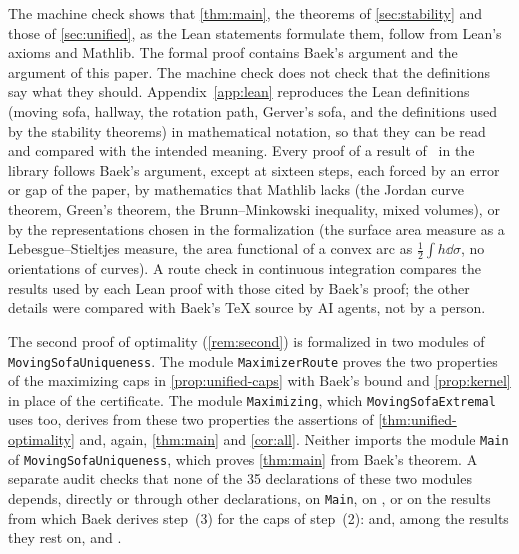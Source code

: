 The machine check shows that \cref{thm:main}, the theorems of
\cref{sec:stability} and those of \cref{sec:unified}, as the Lean statements
formulate them, follow from Lean's axioms and Mathlib. The formal proof
contains Baek's argument and the argument of this paper. The machine check does
not check that the definitions say what
they should. Appendix~\ref{app:lean} reproduces the Lean definitions (moving
sofa, hallway, the rotation path, Gerver's sofa, and the definitions used by the
stability theorems) in mathematical notation, so that they can be read and
compared with the intended meaning. Every proof of a result of~\cite{Baek} in
the library follows Baek's argument, except at sixteen steps, each forced by an
error or gap of the paper, by mathematics that Mathlib lacks (the Jordan curve
theorem, Green's theorem, the Brunn--Minkowski inequality, mixed volumes), or by
the representations chosen in the formalization (the surface area measure as a
Lebesgue--Stieltjes measure, the area functional of a convex arc as $\frac12\int
h\dd\sigma$, no orientations of curves). A route check in continuous integration
compares the results used by each Lean proof with those cited by Baek's proof;
the other details were compared with Baek's TeX source by AI agents, not by a
person.

The second proof of optimality (\cref{rem:second}) is formalized in two modules
of \texttt{MovingSofaUniqueness}. The module \texttt{MaximizerRoute} proves the
two properties of the maximizing caps in \cref{prop:unified-caps} with Baek's
bound and \cref{prop:kernel} in place of the certificate. The module
\texttt{Maximizing}, which \texttt{MovingSofaExtremal} uses too, derives from
these two properties the assertions of \cref{thm:unified-optimality} and, again,
\cref{thm:main} and \cref{cor:all}. Neither imports the module
\texttt{Main} of \texttt{MovingSofaUniqueness}, which proves \cref{thm:main}
from Baek's theorem.
A separate audit checks that none of the 35 declarations of these two modules
depends, directly or through other declarations, on \texttt{Main}, on
, or on the results from which Baek derives step~(3) for the
caps of step~(2):
 and, among the results they rest on,
 and
.


